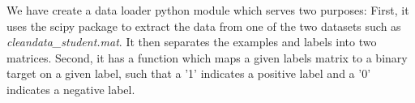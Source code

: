 
We have create a data loader python module which serves two purposes:
First, it uses the scipy package to extract the data from one of the two datasets
such as \emph{cleandata\_student.mat}. It then separates the examples and labels
into two matrices.
Second, it has a function which maps a given labels matrix to a binary target on a given label,
such that a '1' indicates a positive label and a '0' indicates a negative label.
